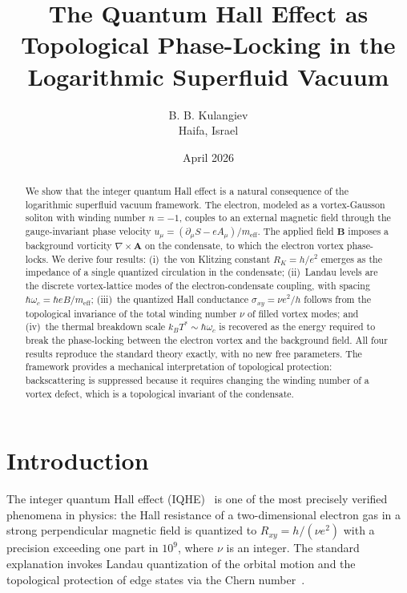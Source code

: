 \documentclass[12pt, a4paper]{article}
\newcommand{\meff}{m_{\mathrm{eff}}}
\begin{document}
\title{The Quantum Hall Effect as Topological
Phase-Locking in the Logarithmic Superfluid Vacuum}

\author{B. B. Kulangiev\\\small{Haifa, Israel}}
\date{April 2026}
\maketitle

\begin{abstract}
\noindent
We show that the integer quantum Hall effect is a
natural consequence of the logarithmic superfluid
vacuum framework. The electron, modeled as a
vortex-Gausson soliton with winding number $n = -1$,
couples to an external magnetic field through the
gauge-invariant phase velocity
$u_\mu = (\partial_\mu S - eA_\mu)/\meff$. The
applied field $\mathbf{B}$ imposes a background
vorticity $\nabla\times\mathbf{A}$ on the condensate,
to which the electron vortex phase-locks. We derive
four results: (i)~the von Klitzing constant
$R_K = h/e^2$ emerges as the impedance of a single
quantized circulation in the condensate;
(ii)~Landau levels are the discrete vortex-lattice
modes of the electron-condensate coupling, with
spacing $\hbar\omega_c = \hbar eB/\meff$;
(iii)~the quantized Hall conductance
$\sigma_{xy} = \nu e^2/h$ follows from the
topological invariance of the total winding number
$\nu$ of filled vortex modes; and (iv)~the thermal
breakdown scale $k_B T^* \sim \hbar\omega_c$
is recovered as the energy required to break the
phase-locking between the electron vortex and the
background field. All four results reproduce the
standard theory exactly, with no new free parameters.
The framework provides a mechanical interpretation
of topological protection: backscattering is
suppressed because it requires changing the winding
number of a vortex defect, which is a topological
invariant of the condensate.
\end{abstract}


\section{Introduction}
\label{sec:intro}

The integer quantum Hall effect
(IQHE)~\cite{klitzing_1980} is one of the most
precisely verified phenomena in physics: the Hall
resistance of a two-dimensional electron gas in a
strong perpendicular magnetic field is quantized to
$R_{xy} = h/(\nu e^2)$ with a precision exceeding
one part in $10^9$, where $\nu$ is an integer. The
standard explanation invokes Landau quantization of
the orbital motion and the topological protection of
edge states via the Chern number~\cite{thouless_1982}.
\end{document}
